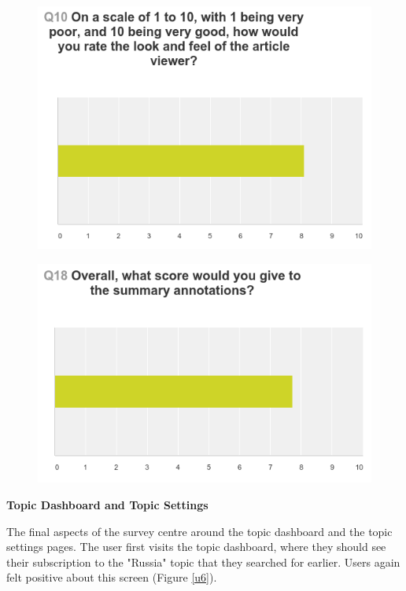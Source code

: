 \documentclass[12pt]{article}
\begin{document}
\begin{figure}[ht!]
  \centering
    \includegraphics[scale=0.5]{ui4.png}
   \caption[A graph depicting responses to the User Interface Survey]{}
   \label{ui4}
\end{figure} 

\begin{figure}[ht!]
  \centering
    \includegraphics[scale=0.5]{ui5.png}
   \caption[A graph depicting responses to the User Interface Survey]{}
   \label{ui5}
\end{figure} 

\textbf{Topic Dashboard and Topic Settings}

The final aspects of the survey centre around the topic dashboard and the topic settings pages. The user first visits the topic dashboard, where they should see their subscription to the "Russia" topic that they searched for earlier. Users again felt positive about this screen (Figure \ref{u6}).
\end{document}
